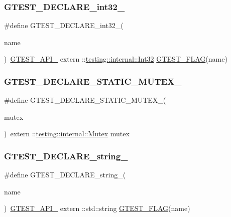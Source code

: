 \mbox{\label{gtest-port_8h_aab2ee98cb616054b1d3a7dc71efe81fc}} 
\subsubsection{\texorpdfstring{GTEST\_DECLARE\_int32\_}{GTEST\_DECLARE\_int32\_}}
{\footnotesize\ttfamily \#define G\+T\+E\+S\+T\+\_\+\+D\+E\+C\+L\+A\+R\+E\+\_\+int32\+\_\+(\begin{DoxyParamCaption}\item[{}]{name }\end{DoxyParamCaption})~\mbox{\hyperlink{gtest-port_8h_aa73be6f0ba4a7456180a94904ce17790}{G\+T\+E\+S\+T\+\_\+\+A\+P\+I\+\_\+}} extern \+::\mbox{\hyperlink{namespacetesting_1_1internal_a8ee38faaf875f133358abaf9bc056cec}{testing\+::internal\+::\+Int32}} \mbox{\hyperlink{gtest-port_8h_a828f4e34a1c4b510da50ec1563e3562a}{G\+T\+E\+S\+T\+\_\+\+F\+L\+AG}}(name)}

\mbox{\label{gtest-port_8h_af0970cdea09f16dbb1dbfccdaa693eeb}} 
\subsubsection{\texorpdfstring{GTEST\_DECLARE\_STATIC\_MUTEX\_}{GTEST\_DECLARE\_STATIC\_MUTEX\_}}
{\footnotesize\ttfamily \#define G\+T\+E\+S\+T\+\_\+\+D\+E\+C\+L\+A\+R\+E\+\_\+\+S\+T\+A\+T\+I\+C\+\_\+\+M\+U\+T\+E\+X\+\_\+(\begin{DoxyParamCaption}\item[{}]{mutex }\end{DoxyParamCaption})~extern \+::\mbox{\hyperlink{classtesting_1_1internal_1_1_mutex}{testing\+::internal\+::\+Mutex}} mutex}

\mbox{\label{gtest-port_8h_a9f74eee05f7ee5534139a622fe7da7dd}} 
\subsubsection{\texorpdfstring{GTEST\_DECLARE\_string\_}{GTEST\_DECLARE\_string\_}}
{\footnotesize\ttfamily \#define G\+T\+E\+S\+T\+\_\+\+D\+E\+C\+L\+A\+R\+E\+\_\+string\+\_\+(\begin{DoxyParamCaption}\item[{}]{name }\end{DoxyParamCaption})~\mbox{\hyperlink{gtest-port_8h_aa73be6f0ba4a7456180a94904ce17790}{G\+T\+E\+S\+T\+\_\+\+A\+P\+I\+\_\+}} extern \+::std\+::string \mbox{\hyperlink{gtest-port_8h_a828f4e34a1c4b510da50ec1563e3562a}{G\+T\+E\+S\+T\+\_\+\+F\+L\+AG}}(name)}

